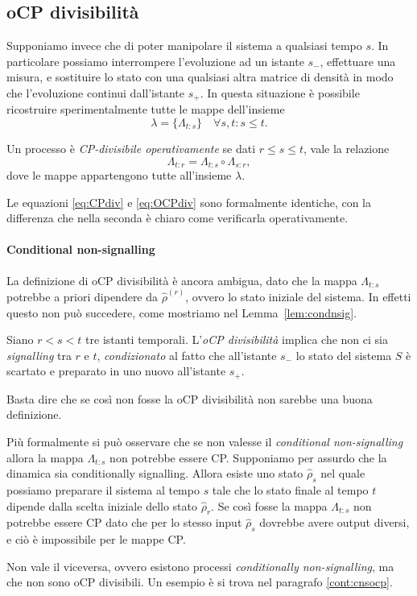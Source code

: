 \documentclass[a4]{article}
\begin{document}
\subsection{oCP divisibilità}
Supponiamo invece che di poter manipolare il sistema a qualsiasi tempo \(s\). In
particolare possiamo interrompere l'evoluzione ad un istante \(s_-\), effettuare una
misura, e sostituire lo stato con una qualsiasi altra matrice di densità in modo che
l'evoluzione continui dall'istante \(s_+\). In questa situazione è  possibile  ricostruire
sperimentalmente tutte le mappe dell'insieme
\[\lambda = \{\Lambda_{t\colon s}\}  \quad \forall s,t\colon s \le t.\]  
\begin{defn}
Un processo è \emph{CP-divisibile operativamente} se dati \(r \le s \le  t\), vale la
relazione 
\begin{equation} \label{eq:OCPdiv}
\Lambda_{t\colon r} = \Lambda_{t\colon s} \circ \Lambda_{s\colon r},
\end{equation}
dove le mappe appartengono tutte all'insieme \(\lambda\).
\end{defn}
Le equazioni \eqref{eq:CPdiv} e \eqref{eq:OCPdiv} sono formalmente identiche, con la
differenza che nella seconda è chiaro come verificarla operativamente.

\paragraph{Conditional non-signalling}
La definizione di oCP divisibilità è ancora ambigua, dato che la mappa \(\Lambda_{t\colon s}\)
potrebbe a priori dipendere da \(\hat{\rho}^{(r)}\), ovvero lo stato iniziale del sistema.
In effetti questo non può succedere, come mostriamo nel Lemma~\ref{lem:condnsig}.
\begin{lem}  \label{lem:condnsig}
	Siano \(r<s<t\) tre istanti temporali. L'\emph{oCP divisibilità} implica che non ci
	sia \emph{signalling} tra \(r\) e \(t\), \emph{condizionato} al fatto che all'istante
	\(s_-\) lo stato del sistema \(S\) è scartato e preparato in uno nuovo all'istante \(s_+\).
	
	\proof Basta dire che se così non fosse la oCP divisibilità non sarebbe una buona
	definizione. 
	
	Più formalmente si può osservare che se non valesse il \emph{conditional non-signalling}
	allora la mappa \(\Lambda_{t\colon s}\) non potrebbe essere CP. 
	Supponiamo per assurdo che la dinamica sia conditionally signalling. Allora esiste
	uno stato \(\hat{\rho}_s\) nel quale possiamo preparare il sistema al tempo \(s\)
	tale che lo stato finale al tempo \(t\) dipende dalla scelta iniziale dello stato
	 \(\hat{\rho}_r\). Se così fosse la mappa \(\Lambda_{t\colon s}\) non potrebbe essere
	 CP dato che per lo stesso input \(\hat{\rho}_s\) dovrebbe avere output diversi, e ciò
	 è impossibile per le mappe CP.
\end{lem}
\begin{ach}
	Non vale il viceversa, ovvero esistono processi \emph{conditionally non-signalling}, ma
	che non sono oCP divisibili. Un esempio è si trova nel paragrafo \ref{cont:cnsocp}.
\end{ach}
\end{document}
